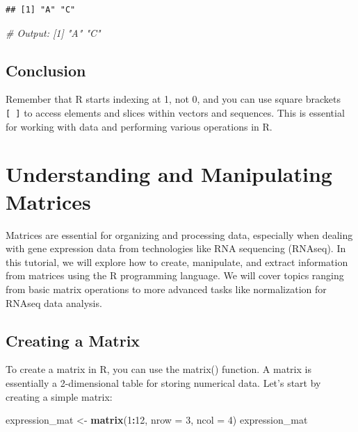 \documentclass[
]{book}
\newenvironment{Shaded}{\begin{snugshade}}{\end{snugshade}}
\newcommand{\AttributeTok}[1]{\textcolor[rgb]{0.13,0.29,0.53}{#1}}
\newcommand{\CommentTok}[1]{\textcolor[rgb]{0.56,0.35,0.01}{\textit{#1}}}
\newcommand{\DecValTok}[1]{\textcolor[rgb]{0.00,0.00,0.81}{#1}}
\newcommand{\FunctionTok}[1]{\textcolor[rgb]{0.13,0.29,0.53}{\textbf{#1}}}
\newcommand{\NormalTok}[1]{#1}
\newcommand{\OtherTok}[1]{\textcolor[rgb]{0.56,0.35,0.01}{#1}}
\newcommand{\SpecialCharTok}[1]{\textcolor[rgb]{0.81,0.36,0.00}{\textbf{#1}}}
\begin{document}
\begin{verbatim}
## [1] "A" "C"
\end{verbatim}

\begin{Shaded}
\begin{Highlighting}[]
\CommentTok{\# Output: [1] "A" "C"}
\end{Highlighting}
\end{Shaded}

\hypertarget{conclusion-1}{%
\subsection{Conclusion}\label{conclusion-1}}

Remember that R starts indexing at 1, not 0, and you can use square brackets \texttt{{[}\ {]}} to access elements and slices within vectors and sequences. This is essential for working with data and performing various operations in R.

\hypertarget{understanding-and-manipulating-matrices}{%
\section{Understanding and Manipulating Matrices}\label{understanding-and-manipulating-matrices}}

Matrices are essential for organizing and processing data, especially when dealing with gene expression data from technologies like RNA sequencing (RNAseq). In this tutorial, we will explore how to create, manipulate, and extract information from matrices using the R programming language. We will cover topics ranging from basic matrix operations to more advanced tasks like normalization for RNAseq data analysis.

\hypertarget{creating-a-matrix}{%
\subsection{Creating a Matrix}\label{creating-a-matrix}}

To create a matrix in R, you can use the matrix() function. A matrix is essentially a 2-dimensional table for storing numerical data. Let's start by creating a simple matrix:

\begin{Shaded}
\begin{Highlighting}[]
\NormalTok{expression\_mat }\OtherTok{\textless{}{-}} \FunctionTok{matrix}\NormalTok{(}\DecValTok{1}\SpecialCharTok{:}\DecValTok{12}\NormalTok{, }\AttributeTok{nrow =} \DecValTok{3}\NormalTok{, }\AttributeTok{ncol =} \DecValTok{4}\NormalTok{)}
\NormalTok{expression\_mat}
\end{Highlighting}
\end{Shaded}
\end{document}
